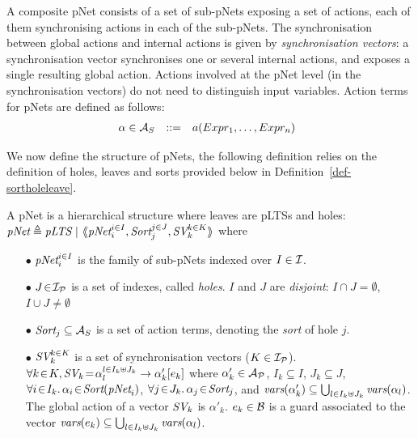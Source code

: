 \documentclass{lncs/llncs}
\begin{document}
A composite pNet consists of a set of sub-pNets exposing
a set of actions, each of them synchronising actions in each of
the sub-pNets. The synchronisation between global actions and
internal actions is given by  \emph{synchronisation vectors}: a
synchronisation vector synchronises one or several internal actions, and
exposes a single resulting global action.
Actions involved at the pNet level (in the synchronisation vectors) do
not need to distinguish  input 
variables. Action terms for pNets are defined as follows:
\[\begin{array}[l]{rcl@{\quad}l}
  \alpha\in \AlgAS &::=&a(Expr_1,\ldots,Expr_n)
\end{array}
\]

We now define the structure of pNets, the following definition relies on the definition 
of holes, leaves and sorts provided below in Definition~\ref{def-sortholeleave}.

\begin{definition}[pNets]\label{def-pnets}
A pNet is a hierarchical structure where leaves are pLTSs and holes:\\
$\pNet\triangleq \pLTS~|~\mylangle \pNet_i^{i\in I}, \Sort_j^{j\in J}, \symb{SV}_k^{k\in 
K}\myrangle$
where
\begin{itemize}
\item[$\bullet$] $\pNet_i^{i\in I}$ is the family of sub-pNets indexed over $I \in \I$.

\item[$\bullet$] $J\!\in\!\I_\P$ is a set of indexes, called \emph{holes}.
$I$ and $J$ are \emph{disjoint}: $I\!\cap\! J=\emptyset$,  $I\!\cup\! J\neq\emptyset$
\item[$\bullet$] $\Sort_j \subseteq \AlgAS$ is a set of action terms, denoting the 
\emph{sort} of
hole $j$.

\item[$\bullet$] $\symb{SV}_k^{k\in K}$ is a set of
  synchronisation vectors ($K\in\I_\P$). $\forall k\!\in\! K,
  \symb{SV}_k\!=\!\SV{\alpha_{l}^{l\in I_k \uplus J_k}}{\alpha'_k}{e_k}$ where
  $\alpha'_k\in \mathcal{A}_\P$, $I_k\subseteq I$, $J_k\subseteq J$,
  $\forall i\!\in\!
  I_k.\,\alpha_{i}\!\in\!\Sort(\pNet_i)$,  $\forall j\!\in\!
  J_k.\,\alpha_{j}\!\in\!\Sort_j$, and $\vars(\alpha'_k)\subseteq \bigcup_{l\in I_k\uplus 
  J_k}{\vars({\alpha_l})}$. The global action of a vector $\symb{SV}_k$ is
$\alpha'_k$. $e_k \in \AlgB$ is a guard associated to the vector 
$\vars(e_k)\subseteq \bigcup_{l\in I_k\uplus J_k}{\vars({\alpha_l})}$.


\end{itemize}
\end{definition}
\end{document}
